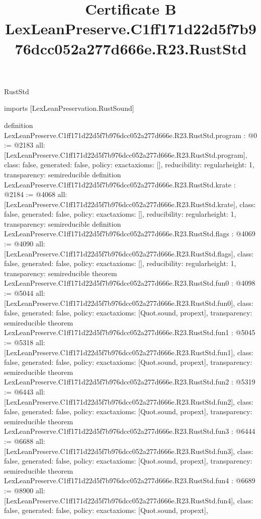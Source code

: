\begin{lexlean}{RustStd}
\title{Certificate B LexLeanPreserve.C1ff171d22d5f7b976dcc052a277d666e.R23.RustStd}
\begin{coremodule}
imports [LexLeanPreservation.RustSound]

definition LexLeanPreserve.C1ff171d22d5f7b976dcc052a277d666e.R23.RustStd.program : @0 := @2183 {
  all: [LexLeanPreserve.C1ff171d22d5f7b976dcc052a277d666e.R23.RustStd.program],
  class: false,
  generated: false,
  policy: exact{axioms: []},
  reducibility: regular{height: 1},
  transparency: semireducible
}
definition LexLeanPreserve.C1ff171d22d5f7b976dcc052a277d666e.R23.RustStd.krate : @2184 := @4068 {
  all: [LexLeanPreserve.C1ff171d22d5f7b976dcc052a277d666e.R23.RustStd.krate],
  class: false,
  generated: false,
  policy: exact{axioms: []},
  reducibility: regular{height: 1},
  transparency: semireducible
}
definition LexLeanPreserve.C1ff171d22d5f7b976dcc052a277d666e.R23.RustStd.flags : @4069 := @4090 {
  all: [LexLeanPreserve.C1ff171d22d5f7b976dcc052a277d666e.R23.RustStd.flags],
  class: false,
  generated: false,
  policy: exact{axioms: []},
  reducibility: regular{height: 1},
  transparency: semireducible
}
theorem LexLeanPreserve.C1ff171d22d5f7b976dcc052a277d666e.R23.RustStd.fun0 : @4098 := @5044 {
  all: [LexLeanPreserve.C1ff171d22d5f7b976dcc052a277d666e.R23.RustStd.fun0],
  class: false,
  generated: false,
  policy: exact{axioms: [Quot.sound, propext]},
  transparency: semireducible
}
theorem LexLeanPreserve.C1ff171d22d5f7b976dcc052a277d666e.R23.RustStd.fun1 : @5045 := @5318 {
  all: [LexLeanPreserve.C1ff171d22d5f7b976dcc052a277d666e.R23.RustStd.fun1],
  class: false,
  generated: false,
  policy: exact{axioms: [Quot.sound, propext]},
  transparency: semireducible
}
theorem LexLeanPreserve.C1ff171d22d5f7b976dcc052a277d666e.R23.RustStd.fun2 : @5319 := @6443 {
  all: [LexLeanPreserve.C1ff171d22d5f7b976dcc052a277d666e.R23.RustStd.fun2],
  class: false,
  generated: false,
  policy: exact{axioms: [Quot.sound, propext]},
  transparency: semireducible
}
theorem LexLeanPreserve.C1ff171d22d5f7b976dcc052a277d666e.R23.RustStd.fun3 : @6444 := @6688 {
  all: [LexLeanPreserve.C1ff171d22d5f7b976dcc052a277d666e.R23.RustStd.fun3],
  class: false,
  generated: false,
  policy: exact{axioms: [Quot.sound, propext]},
  transparency: semireducible
}
theorem LexLeanPreserve.C1ff171d22d5f7b976dcc052a277d666e.R23.RustStd.fun4 : @6689 := @8900 {
  all: [LexLeanPreserve.C1ff171d22d5f7b976dcc052a277d666e.R23.RustStd.fun4],
  class: false,
  generated: false,
  policy: exact{axioms: [Quot.sound, propext]},
}
\end{coremodule}
\end{lexlean}
